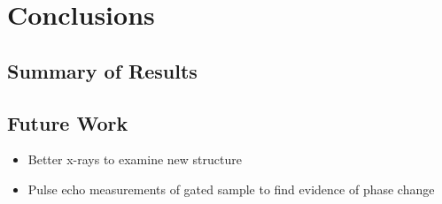 \chapter{Conclusions}

\section{Summary of Results}

\section{Future Work}
\begin{itemize}
\item Better x-rays to examine new structure
\item Pulse echo measurements of gated sample to find evidence of phase change
\end{itemize}